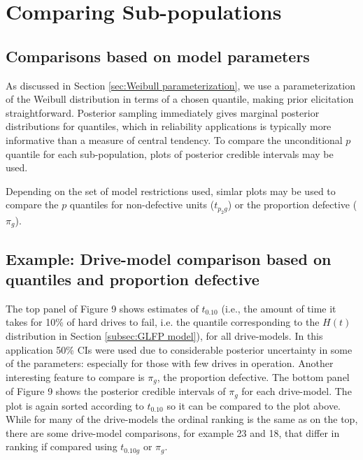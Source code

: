 \documentclass[12pt]{article}
\begin{document}
\section{Comparing Sub-populations}
\subsection{Comparisons based on model parameters}
As discussed in Section \ref{sec:Weibull parameterization}, we use a parameterization of the Weibull distribution in terms of a chosen quantile, making prior elicitation straightforward. Posterior sampling immediately gives marginal posterior distributions for quantiles, which in reliability applications is typically more informative than a measure of central tendency. To compare the unconditional $p$ quantile for each sub-population, plots of posterior credible intervals may be used.

Depending on the set of model restrictions used, simlar plots may be used to compare the $p$ quantiles for non-defective units ($t_{p_{2}g}$) or the proportion defective ($\pi_g$).

\subsection{Example: Drive-model comparison based on quantiles and proportion defective}
The top panel of Figure 9 shows estimates of $t_{0.10}$ (i.e., the amount of time it takes for 10\% of hard drives to fail, i.e. the quantile corresponding to the $H(t)$ distribution in Section \ref{subsec:GLFP model}), for all drive-models.  In this application 50\% CIs were used due to considerable posterior uncertainty in some of the parameters: especially for those with few drives in operation.  %
Another interesting feature to compare is $\pi_g$, the proportion defective.  The bottom panel of Figure 9 shows the posterior credible intervals of $\pi_g$ for each drive-model.  The plot is again sorted according to $t_{0.10}$ so it can be compared to the plot above.  While for many of the drive-models the ordinal ranking is the same as on the top, there are some drive-model comparisons, for example 23 and 18, that differ in ranking if compared using $t_{0.10g}$ or $\pi_g$.
\end{document}
